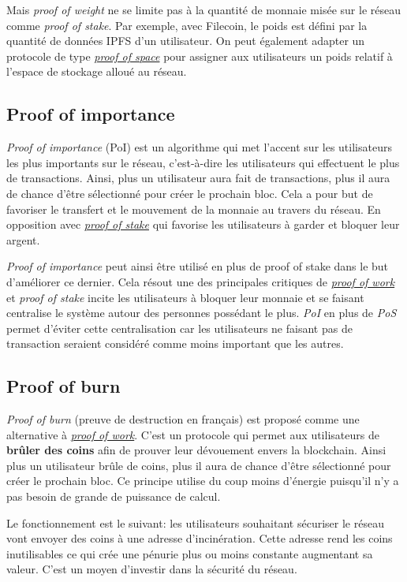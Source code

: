 Mais \emph{proof of weight} ne se limite pas à la quantité de monnaie misée sur le réseau comme \emph{proof of stake}. Par exemple, avec Filecoin, le poids est défini par la quantité de données IPFS d'un utilisateur. On peut également adapter un protocole de type \hyperref[consensus:pospace]{\emph{proof of space}} pour assigner aux utilisateurs un poids relatif à l'espace de stockage alloué au réseau.

\subsection{Proof of importance}

\emph{Proof of importance} (PoI) est un algorithme qui met l'accent sur les utilisateurs les plus importants sur le réseau, c'est-à-dire les utilisateurs qui effectuent le plus de transactions. Ainsi, plus un utilisateur aura fait de transactions, plus il aura de chance d'être sélectionné pour créer le prochain bloc. Cela a pour but de favoriser le transfert et le mouvement de la monnaie au travers du réseau. En opposition avec \hyperref[consensus:pos]{\emph{proof of stake}} qui favorise les utilisateurs à garder et bloquer leur argent.

\emph{Proof of importance} peut ainsi être utilisé en plus de proof of stake dans le but d'améliorer ce dernier. Cela résout une des principales critiques de \hyperref[consensus:pow]{\emph{proof of work}} et \emph{proof of stake} incite les utilisateurs à bloquer leur monnaie et se faisant centralise le système autour des personnes possédant le plus. \emph{PoI} en plus de \emph{PoS} permet d'éviter cette centralisation car les utilisateurs ne faisant pas de transaction seraient considéré comme moins important que les autres.

\subsection{Proof of burn}

\emph{Proof of burn} (preuve de destruction en français) est proposé comme une alternative à \hyperref[consensus:pow]{\emph{proof of work}}. C'est un protocole qui permet aux utilisateurs de \textbf{brûler des coins} afin de prouver leur dévouement envers la blockchain. Ainsi plus un utilisateur brûle de coins, plus il aura de chance d'être sélectionné pour créer le prochain bloc. Ce principe utilise du coup moins d'énergie puisqu'il n'y a pas besoin de grande de puissance de calcul.

Le fonctionnement est le suivant: les utilisateurs souhaitant sécuriser le réseau vont envoyer des coins à une adresse d'incinération. Cette adresse rend les coins inutilisables ce qui crée une pénurie plus ou moins constante augmentant sa valeur. C'est un moyen d'investir dans la sécurité du réseau.

